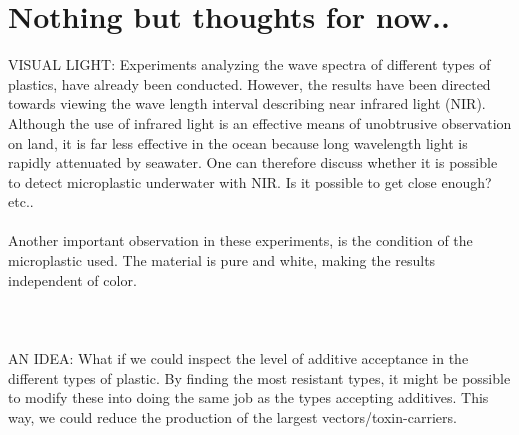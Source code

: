 \section{Nothing but thoughts for now..}
VISUAL LIGHT:
Experiments analyzing the wave spectra of different types of plastics, have already been conducted. However, the results have been directed towards viewing the wave length interval describing near infrared light (NIR). Although the use of infrared light is an effective means of unobtrusive observation on land, it is far less effective in the ocean because long wavelength light is rapidly attenuated by seawater. One can therefore discuss whether it is possible to detect microplastic underwater with NIR. Is it possible to get close enough? etc..
\\\\
Another important observation in these experiments, is the condition of the microplastic used. The material is pure and white, making the results independent of color. 
\\\\



\\\\
\noindent
AN IDEA: 
What if we could inspect the level of additive acceptance in the different types of plastic. By finding the most resistant types, it might be possible to modify these into doing the same job as the types accepting additives. This way, we could reduce the production of the largest vectors/toxin-carriers. 

